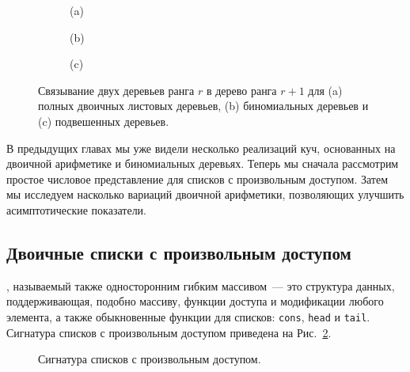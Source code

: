 \begin{figure}
  \centering
  \begin{subfigure}[b]{0.45\textwidth}
    \centering
    \par\vspace{0.2cm}
    (a)
  \end{subfigure}
  \begin{subfigure}[b]{0.45\textwidth}
    \centering
    \par\vspace{0.2cm}
    (b)
  \end{subfigure}\par\vspace{0.2cm}
  \begin{subfigure}[b]{1\textwidth}
    \centering
    \par\vspace{0.2cm}
    (c)
  \end{subfigure}

  \caption{Связывание двух деревьев ранга $r$ в дерево ранга $r+1$ для
    (a) полных двоичных листовых деревьев, (b) биномиальных деревьев и
    (c) подвешенных деревьев.}
  \label{fig:9.3}
\end{figure}

В предыдущих главах мы уже видели несколько реализаций куч,
основанных на двоичной арифметике и биномиальных деревьях. Теперь мы
сначала рассмотрим простое числовое представление для списков с
произвольным доступом. Затем мы исследуем насколько вариаций двоичной
арифметики, позволяющих улучшить асимптотические показатели.

\subsection{Двоичные списки с произвольным доступом}
\label{sc:9.2.1}

, называемый
также односторонним гибким массивом~--- это структура данных,
поддерживающая, подобно массиву, функции доступа и модификации любого
элемента, а также обыкновенные функции для списков: \lstinline!cons!,
\lstinline!head! и \lstinline!tail!. Сигнатура списков с произвольным
доступом приведена на Рис.~\ref{fig:9.4}.

\begin{figure}
  \centering

  \caption{Сигнатура списков с произвольным доступом.}
  \label{fig:9.4}
\end{figure}

